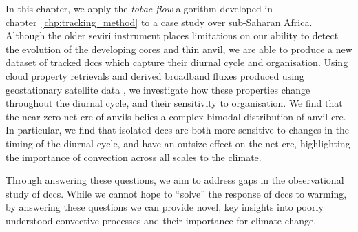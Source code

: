 In this chapter, we apply the \textit{tobac-flow} algorithm developed in chapter~\ref{chp:tracking_method} to a case study over sub-Saharan Africa.
Although the older \acrshort{seviri} instrument places limitations on our ability to detect the evolution of the developing cores and thin anvil, we are able to produce a new dataset of tracked \acrshort{dcc}s which capture their diurnal cycle and organisation.
Using cloud property retrievals and derived broadband fluxes produced using geostationary satellite data \citep{sus_community_2018, mcgarragh_community_2018}, we investigate how these properties change throughout the diurnal cycle, and their sensitivity to organisation.
We find that the near-zero net \acrshort{cre} of anvils belies a complex bimodal distribution of anvil \acrshort{cre}.
In particular, we find that isolated \acrshort{dcc}s are both more sensitive to changes in the timing of the diurnal cycle, and have an outsize effect on the net \acrshort{cre}, highlighting the importance of convection across all scales to the climate.

Through answering these questions, we aim to address gaps in the observational study of \acrshort{dcc}s.
While we cannot hope to ``solve'' the response of \acrshort{dcc}s to warming, by answering these questions we can provide novel, key insights into poorly understood convective processes and their importance for climate change.




